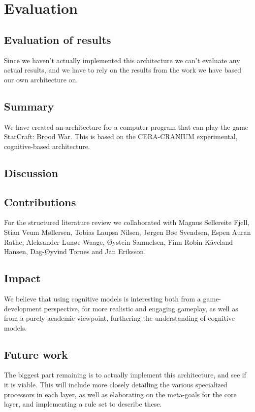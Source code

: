 \chapter{Evaluation}
\section{Evaluation of results}
Since we haven't actually implemented this architecture we can't evaluate any
actual results, and we have to rely on the results from the work we have based
our own architecture on.

\section{Summary}
We have created an architecture for a computer program that can play the game
StarCraft: Brood War. This is based on the CERA-CRANIUM experimental,
cognitive-based architecture.


\section{Discussion}


\section{Contributions}
For the structured literature review we collaborated with Magnus Sellereite
Fjell, Stian Veum M{\o}llersen, Tobias Laupsa Nilsen, J{\o}rgen B{\o}e Svendsen,
Espen Auran Rathe, Aleksander Lun{\o}e Waage, {\O}ystein Samuelsen, Finn Robin
K{\aa}veland Hansen, Dag-{\O}yvind Tornes and Jan Eriksson.


\section{Impact}
We believe that using cognitive models is interesting both from a
game-development perspective, for more realistic and engaging gameplay, as well
as from a purely academic viewpoint, furthering the understanding of cognitive
models.

\section{Future work}
The biggest part remaining is to actually implement this architecture, and see
if it is viable. This will include more closely detailing the various
specialized processors in each layer, as well as elaborating on the meta-goals
for the core layer, and implementing a rule set to describe these.